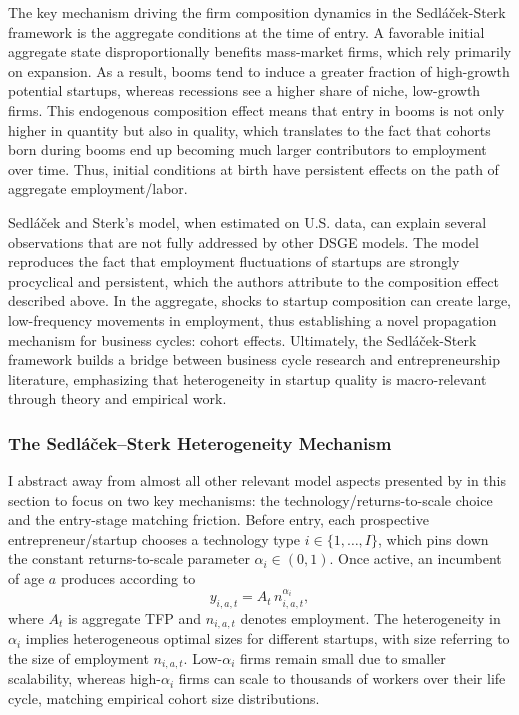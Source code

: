 \documentclass[a4paper,12pt]{article} %
\numberwithin{equation}{section} %
\numberwithin{figure}{section}
\numberwithin{table}{section}
\begin{document}
The key mechanism driving the firm composition dynamics in the Sedláček-Sterk framework is the aggregate conditions at the time of entry. 
A favorable initial aggregate state disproportionally benefits mass-market firms, which rely primarily on expansion. As a result, 
booms tend to induce a greater fraction of high-growth potential startups, whereas recessions see a higher share of niche, low-growth firms. 
This endogenous composition effect means that entry in booms is not only higher in quantity but also in quality, which translates to the 
fact that cohorts born during booms end up becoming much larger contributors to employment over time. Thus, initial conditions at birth 
have persistent effects on the path of aggregate employment/labor.

Sedláček and Sterk’s model, when estimated on U.S. data, can explain several observations that are not fully addressed by other DSGE models. 
The model reproduces the fact that employment fluctuations of startups are strongly procyclical and persistent, which the authors 
attribute to the composition effect described above. In the aggregate, shocks to startup composition can create large, 
low-frequency movements in employment, thus establishing a novel propagation mechanism for business cycles: cohort effects. Ultimately, 
the Sedláček-Sterk framework builds a bridge between business cycle research and entrepreneurship literature, emphasizing that 
heterogeneity in startup quality is macro-relevant through theory and empirical work.

\subsubsection{The Sedláček–Sterk Heterogeneity Mechanism}
I abstract away from almost all other relevant model aspects presented by \textcite{sedlavcek2017growth} 
in this section to focus on two key mechanisms: the technology/returns-to-scale choice and the entry-stage 
matching friction. Before entry, each prospective entrepreneur/startup chooses a technology type $i\in\{1,\dots,I\}$,
which pins down the constant returns-to-scale parameter $\alpha_i\in(0,1)$. Once active, an incumbent of age $a$ 
produces according to 
\[
y_{i,a,t}=A_t\,n_{i,a,t}^{\alpha_i},
\]
where $A_t$ is aggregate TFP and $n_{i,a,t}$ denotes employment. The heterogeneity in $\alpha_i$ implies 
heterogeneous optimal sizes for different startups, with size referring to the size of employment $n_{i,a,t}$. Low-$\alpha_i$ firms remain small due to smaller scalability, whereas high-$\alpha_i$ firms can scale 
to thousands of workers over their life cycle, matching empirical cohort size distributions. 
\end{document}
